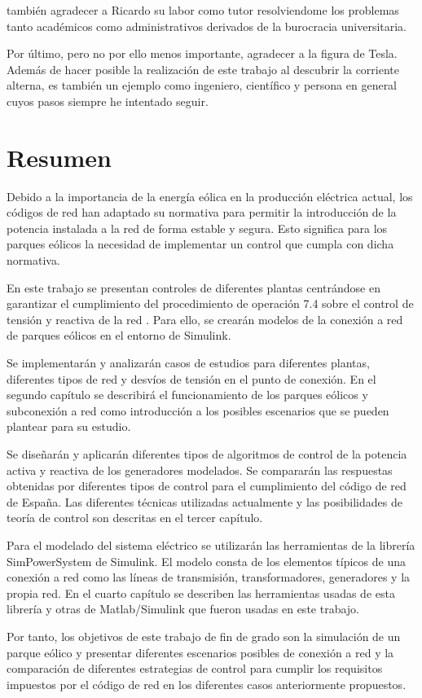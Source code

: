 \documentclass{book}
\begin{document}
tambi\'en agradecer a Ricardo su labor como tutor resolviendome los problemas tanto acad\'emicos como administrativos derivados de la burocracia universitaria. 

Por \'ultimo, pero no por ello menos importante, agradecer a la figura de Tesla. Adem\'as de hacer posible la realizaci\'on de este trabajo al descubrir la corriente alterna, es tambi\'en un ejemplo como ingeniero, cient\'ifico y persona en general cuyos pasos siempre he intentado seguir.

\chapter*{Resumen}

Debido a la importancia de la energ\'ia e\'olica en la producci\'on el\'ectrica actual, los c\'odigos de red han adaptado su normativa para permitir la introducci\'on de la potencia instalada a la red de forma estable y segura. Esto significa para los parques e\'olicos la necesidad de implementar un control que cumpla con dicha normativa. \par
En este trabajo se presentan controles de diferentes plantas centr\'andose en garantizar el cumplimiento del procedimiento de operaci\'on 7.4 sobre el control de tensi\'on y reactiva de la red \cite{PO74}. Para ello, se crear\'an modelos de la conexi\'on a red de parques e\'olicos en el entorno de Simulink. \par
Se implementar\'an y analizar\'an casos de estudios para diferentes plantas, diferentes tipos de red y desv\'ios de tensi\'on en el punto de conexi\'on. En el segundo cap\'itulo se describir\'a el funcionamiento de los parques e\'olicos y subconexi\'on a red como introducci\'on a los posibles escenarios que se pueden plantear para su estudio. \par
Se diseñar\'an y aplicar\'an diferentes tipos de algoritmos de control de la potencia activa y reactiva de los generadores modelados. Se comparar\'an las respuestas obtenidas por diferentes tipos de control para el cumplimiento del c\'odigo de red de España. Las diferentes t\'ecnicas utilizadas actualmente y las posibilidades de teor\'ia de control son descritas en el tercer cap\'itulo. \par
Para el modelado del sistema el\'ectrico se utilizar\'an las herramientas de la librer\'ia SimPowerSystem de Simulink. El modelo consta de los elementos t\'ipicos de una conexi\'on a red como las l\'ineas de transmisi\'on, transformadores, generadores y la propia red. En el cuarto cap\'itulo se describen las herramientas usadas de esta librer\'ia y otras de Matlab/Simulink que fueron usadas en este trabajo. \par
Por tanto, los objetivos de este trabajo de fin de grado son la simulaci\'on de un parque e\'olico y presentar diferentes escenarios posibles de conexi\'on a red y la comparaci\'on de diferentes estrategias de control para cumplir los requisitos impuestos por el c\'odigo de red en los diferentes casos anteriormente propuestos. \par
\end{document}
